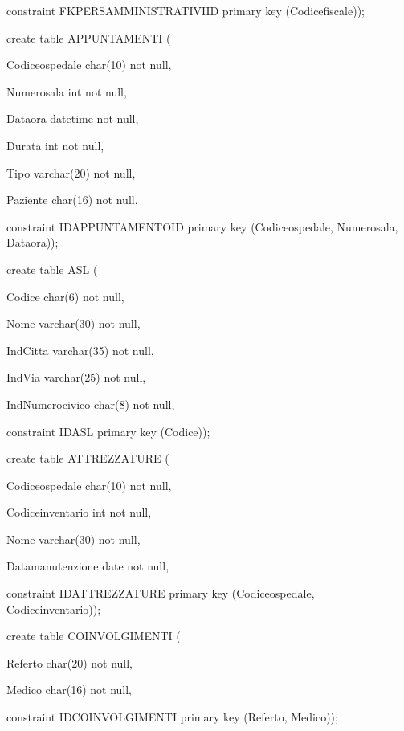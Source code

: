 \documentclass[a4paper,12pt]{report}
\begin{document}
     constraint FKPERS\textunderscore AMMINISTRATIVI\textunderscore ID primary key (Codice\textunderscore fiscale));
     \newline

\noindent create table APPUNTAMENTI (

     Codice\textunderscore ospedale char(10) not null,

     Numero\textunderscore sala int not null,

     Data\textunderscore ora datetime not null,

     Durata int not null,

     Tipo varchar(20) not null,

     Paziente char(16) not null,

     constraint IDAPPUNTAMENTO\textunderscore ID primary key (Codice\textunderscore ospedale, Numero\textunderscore sala, Data\textunderscore ora));
     \newline

\noindent create table ASL (

     Codice char(6) not null,

     Nome varchar(30) not null,
     
     Ind\textunderscore Citta varchar(35) not null,
     
     Ind\textunderscore Via varchar(25) not null,
     
     Ind\textunderscore Numero\textunderscore civico char(8) not null,
     
     constraint IDASL primary key (Codice));

\noindent create table ATTREZZATURE (

     Codice\textunderscore ospedale char(10) not null,

     Codice\textunderscore inventario int not null,

     Nome varchar(30) not null,

     Data\textunderscore manutenzione date not null,

     constraint IDATTREZZATURE primary key (Codice\textunderscore ospedale, Codice\textunderscore inventario));
     \newline

\noindent create table COINVOLGIMENTI (
     
     Referto char(20) not null,
     
     Medico char(16) not null,
     
     constraint IDCOINVOLGIMENTI primary key (Referto, Medico)); \newline
\end{document}

